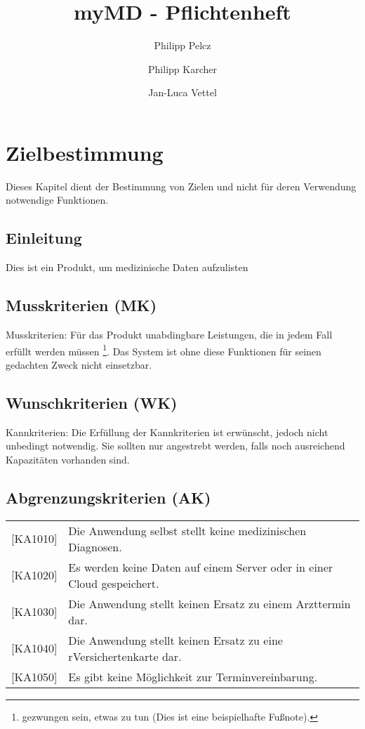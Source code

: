\documentclass[a4paper]{scrreprt}
\begin{document}
 
\begin{titlepage}

\title{myMD - Pflichtenheft}
\author{Philipp Pelcz \and Philipp Karcher \and Jan-Luca Vettel}

\end{titlepage} 

\maketitle
 

\tableofcontents
 
\chapter{Zielbestimmung}
Dieses Kapitel dient der Bestimmung von Zielen und nicht für deren Verwendung
notwendige Funktionen.

\section{Einleitung}
Dies ist ein Produkt, um medizinische Daten aufzulisten
 
\section{Musskriterien (MK)}
Musskriterien: Für das Produkt unabdingbare Leistungen, die in jedem Fall
erfüllt werden müssen \footnote{gezwungen sein, etwas zu tun (Dies ist eine
beispielhafte Fußnote).}. Das System ist ohne diese Funktionen für seinen
gedachten Zweck nicht einsetzbar.
 
\section{Wunschkriterien (WK)}
Kannkriterien: Die Erfüllung der Kannkriterien ist erwünscht, jedoch nicht
unbedingt notwendig. Sie sollten nur angestrebt werden, falls noch ausreichend
Kapazitäten vorhanden sind.
 
\section{Abgrenzungskriterien (AK)}
\begin{tabular}{ll}
[KA1010] &  Die Anwendung selbst stellt keine medizinischen Diagnosen. \\
{[KA1020]} &  Es werden keine Daten auf einem Server oder in einer Cloud gespeichert. \\
{[KA1030]} &  Die Anwendung stellt keinen Ersatz zu einem Arzttermin dar. \\
{[KA1040]} &  Die Anwendung stellt keinen Ersatz zu eine rVersichertenkarte dar. \\
{[KA1050]} &  Es gibt keine Möglichkeit zur Terminvereinbarung. \\
\end{tabular}
 
\end{document}
